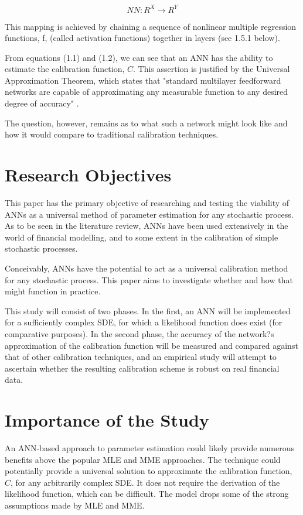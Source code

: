 \documentclass[11pt,oneside,openany,a4paper,english, report, goldenblock
]{usthesis}
\begin{document}
\begin{equation}
NN: R^X \rightarrow R^Y
\end{equation}

This mapping is achieved by chaining a sequence of nonlinear multiple regression functions, f, (called activation functions) together in layers (see 1.5.1 below).


From equations (1.1) and (1.2), we can see that an ANN has the ability to estimate the calibration function, $ C $. 
This assertion is justified by the Universal Approximation Theorem, which states that "standard multilayer feedforward networks are capable of approximating any measurable function to any desired degree of accuracy" \citep{Hornik}.


The question, however, remains as to what such a network might look like and how it would compare to traditional calibration techniques.

\section{Research Objectives}
This paper has the primary objective of researching and testing the viability of ANNs as a universal method of parameter estimation for any stochastic process. As to be seen in the literature review, ANNs have been used extensively in the world of financial modelling, and to some extent in the calibration of simple stochastic processes.


Conceivably, ANNs have the potential to act as a universal calibration method for any stochastic process. This paper aims to investigate whether and how that might function in practice.


This study will consist of two phases. In the first, an ANN will be implemented for a sufficiently complex SDE, for which a likelihood function does exist (for comparative purposes). In the second phase, the accuracy of the network?s approximation of the calibration function will be measured and compared against that of other calibration techniques, and an empirical study will attempt to ascertain whether the resulting calibration scheme is robust on real financial data.

\section{Importance of the Study}

An ANN-based approach to parameter estimation could likely provide numerous benefits above the popular MLE and MME approaches.
The technique could potentially provide a universal solution to approximate the calibration function, $C$, for any arbitrarily complex SDE.
It does not require the derivation of the likelihood function, which can be difficult.
The model drops some of the strong assumptions made by MLE and MME. 
\end{document}
